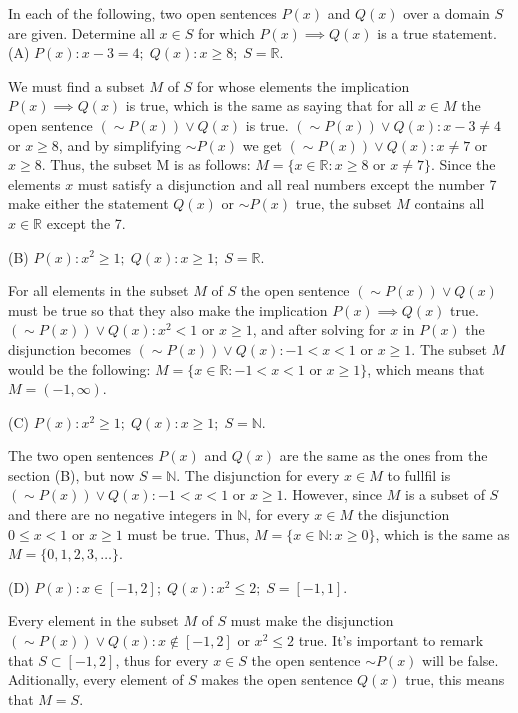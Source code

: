 \documentclass[12pt]{article}
\newcommand{\N}{\mathbb{N}}
\newenvironment{problem}[2][Problem]{\begin{trivlist}
		\item[\hskip \labelsep {\bfseries #1}\hskip \labelsep {\bfseries #2.}]}{\end{trivlist}}
\newenvironment{solution}[2][Solution]{\begin{trivlist}
		\item[\hskip \labelsep {\bfseries #1}\hskip \labelsep {\bfseries #2.}]}{\end{trivlist}}
\begin{document}
\begin{problem}{32}
	In each of the following, two open sentences $P(x)$ and $Q(x)$ over a domain $S$ are given. Determine all $x \in S$ for which $P(x) \implies Q(x)$ is a true statement.\\
	
	(A) $P(x): x-3=4; \; Q(x): x \geq 8; \; S = \mathbb{R}$.
	\begin{solution}{a}
		We must find a subset $M$ of $S$ for whose elements the implication $P(x) \implies Q(x)$ is true, which is the same as saying that for all $x \in M$ the open sentence $(\sim P(x))\vee Q(x)$ is true. $(\sim P(x)) \vee Q(x):  x - 3 \neq 4$ or $x \geq 8$, and by simplifying  $\sim P(x)$ we get $(\sim P(x)) \vee Q(x):  x \neq 7$ or $x \geq 8$. Thus, the subset M is as follows: $M = \{x \in \mathbb{R}: x \geq 8 \text{ or } x \neq 7\}$. Since the elements $x$ must satisfy a disjunction and  all real numbers except the number 7 make either the statement $Q(x)$ or $\sim P(x)$ true, the subset $M$ contains all $x \in \mathbb{R}$ except the 7. \\ 
	\end{solution}

	(B) $P(x): x^{2} \geq 1; \; Q(x): x \geq 1; \; S = \mathbb{R}$.
	\begin{solution}{b}
		For all elements in the subset $M$ of $S$ the open sentence $(\sim P(x)) \vee Q(x)$ must be true so that they also make the implication $P(x) \implies Q(x)$ true. $(\sim P(x)) \vee Q(x): x^2 < 1 \text{ or } x \geq 1$, and after solving for $x$ in $P(x)$ the disjunction becomes $(\sim P(x)) \vee Q(x): -1 < x < 1 \text{ or } x \geq 1$. The subset $M$ would be the following: $M = \{x \in \mathbb{R}: -1 < x < 1 \text{ or } x \geq 1\}$, which means that $M = (-1, \infty)$.\\
	\end{solution}

	(C) $P(x): x^{2} \geq 1; \; Q(x): x\geq 1; \; S = \N$.
	\begin{solution}{c}
		The two open sentences $P(x)$ and $Q(x)$ are the same as the ones from the section (B), but now $S = \N$. The disjunction for every $x \in M$ to fullfil is $(\sim P(x)) \vee Q(x): -1 < x < 1 \text{ or } x \geq 1$. However, since $M$ is a subset of $S$ and there are no negative integers in $\N$, for every $x \in M$ the disjunction  $0 \leq x < 1 \text{ or } x \geq 1$ must be true.  Thus, $M = \{x \in \N: x\geq 0\}$, which is the same as $M = \{0, 1, 2, 3, \dots \}$.
	\end{solution}
	
	(D) $P(x): x \in [-1,2]; \; Q(x): x^{2} \leq 2; \; S=[-1,1]$.
	\begin{solution}{d}
		Every element in the subset $M$ of $S$ must make the disjunction $(\sim P(x)) \vee Q(x): x \notin [-1,2] \text{ or } x^{2} \leq 2$ true. It's important to remark that $S \subset [-1,2]$, thus for every $x \in S$ the open sentence $\sim P(x)$ will be false. Aditionally, every element of $S$ makes the open sentence $Q(x)$ true, this means that $M = S$.
	\end{solution}
\end{problem}
\end{document}
